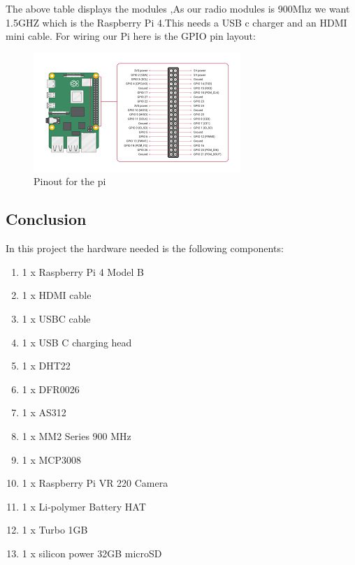 The above table displays the modules ,As our radio modules is 900Mhz  we want  1.5GHZ which is the Raspberry Pi 4.This needs a USB\- c charger and an HDMI mini cable.
For wiring our Pi here is  the GPIO pin layout:
\begin{figure}[h!]
	\centering
	\includegraphics[width=0.8\linewidth]{Images/Pinout_of_pi.png}
	\caption*{Pinout for  the  pi}
	\label{Pinout for  the  pi}
\end{figure}

\subsection{Conclusion}
In this project the hardware needed is the  following components:
\begin{enumerate}
	\item 1 x Raspberry Pi 4 Model B 
	\item 1 x HDMI cable
	\item 1 x USB\-C cable
	\item 1 x USB \-C charging head
	\item 1 x DHT22
	\item 1 x DFR0026
	\item 1 x AS312
	\item 1 x MM2 Series 900 MHz
	\item 1 x MCP3008
	\item 1 x Raspberry Pi VR 220 Camera
	\item  1 x Li-polymer Battery HAT 
	\item 1 x Turbo 1GB
	\item 1 x silicon power 32GB  microSD
	
	
\end{enumerate}